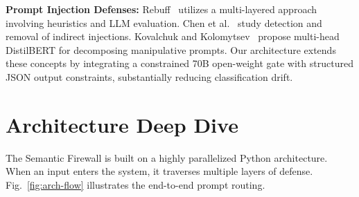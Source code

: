\documentclass[conference]{IEEEtran}
\begin{document}
\textbf{Prompt Injection Defenses:} Rebuff~\cite{rebuff} utilizes a multi-layered approach involving heuristics and LLM evaluation. Chen et al.~\cite{chen_indirect} study detection and removal of indirect injections. Kovalchuk and Kolomytsev~\cite{kovalchuk_method} propose multi-head DistilBERT for decomposing manipulative prompts. Our architecture extends these concepts by integrating a constrained 70B open-weight gate with structured JSON output constraints, substantially reducing classification drift.

\section{Architecture Deep Dive}

The Semantic Firewall is built on a highly parallelized Python architecture. When an input enters the system, it traverses multiple layers of defense. Fig.~\ref{fig:arch-flow} illustrates the end-to-end prompt routing.
\end{document}

